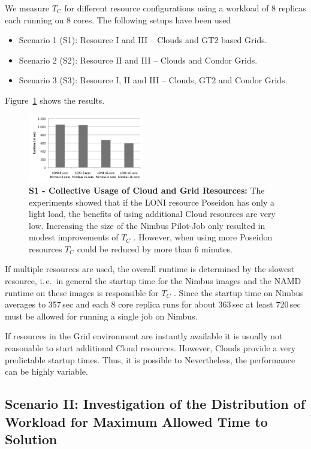 \documentclass[conference,final]{IEEEtran}
\newcommand{\tc}{$T_{C}$ }
\begin{document}
We measure \tc for different resource configurations using a workload
of 8 replicas each running on 8 cores. The following setups have been used
\begin{itemize}
\item Scenario 1 (S1): Resource I and III -- Clouds and GT2 based Grids. 
\item Scenario 2 (S2): Resource II and III -- Clouds and Condor Grids.
\item Scenario 3 (S3): Resource I, II and III -- Clouds, GT2 and Condor Grids.
\end{itemize} 
Figure~\ref{fig:performance_8replica_scenario_poseidon_nimbus}
shows the results.
\begin{figure}[htbp]
    \centering
        \includegraphics[width=0.45\textwidth]{performance/8replica_scenario_poseidon_nimbus}
        \caption{\textbf{S1 - Collective Usage of Cloud and Grid
            Resources: } The experiments showed that if the LONI
          resource Poseidon has only a light load, the benefits of
          using additional Cloud resources are very low. Increasing
          the size of the Nimbus Pilot-Job only resulted in modest
          improvements of \tc.  However, when using more Poseidon
          resources \tc could be reduced by more than 6 minutes.}
    \label{fig:performance_8replica_scenario_poseidon_nimbus}
\end{figure}

If multiple resources are used, the overall runtime is determined by the slowest resource, i.\,e.\ in 
general the startup time for the Nimbus images and the NAMD runtime on these images is responsible for \tc.
Since the startup time on Nimbus averages to 357\,sec and each 8 core replica runs for 
about 363\,sec at least 720\,sec must be allowed for running a single job on Nimbus. 


If resources in the Grid environment are instantly available it is usually not reasonable to start
additional Cloud resources. However, Clouds provide a very predictable startup times. Thus,
it is possible to  Nevertheless, the performance can be highly variable.

\subsection{Scenario II: Investigation of the Distribution of Workload for Maximum Allowed
  Time to Solution} 
\end{document}
